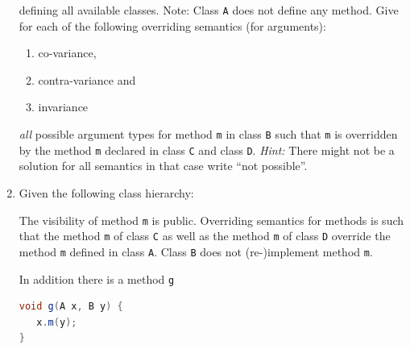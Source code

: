 \documentclass{article}
\newcommand{\comment}[1]{\marginpar{#1}}
\begin{document}
\begin{enumerate}
\begin{center}
\end{center}
defining all available classes. Note: Class \lstinline!A! does not
define any method.
Give for each of the following overriding semantics (for arguments):
\begin{enumerate}
  \item co-variance,
  \item contra-variance and
  \item invariance
\end{enumerate}
\emph{all} possible argument types for method
\lstinline!m! in class \lstinline!B! such that
\lstinline!m! is overridden by the method \lstinline!m! declared in
class \lstinline!C! and class \lstinline!D!. \emph{Hint:} There might
not be a solution for all semantics in that case write ``not possible''.  \comment{\textbf{3 points}}\newpage
\item Given the following class hierarchy:\\

The visibility of method \lstinline!m! is public. Overriding semantics
for methods is such that the method \lstinline!m!  of class
\lstinline!C! as well as the method \lstinline!m! of class
\lstinline!D! override the method \lstinline!m! defined in class
\lstinline!A!. Class \lstinline!B! does not (re-)implement method
\lstinline!m!.

In addition there is a method \lstinline!g! 
\begin{lstlisting}[language=Java, columns=flexible]
void g(A x, B y) {
   x.m(y);
}
\end{lstlisting}


\end{enumerate}
\end{document}
